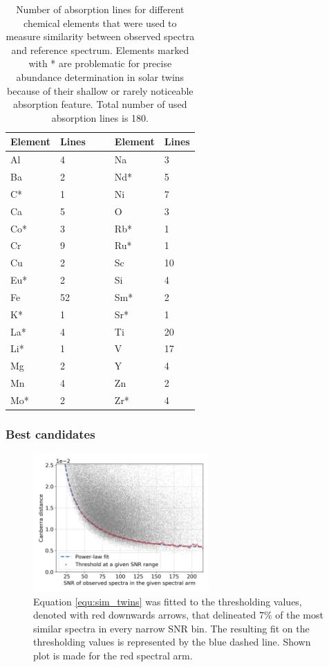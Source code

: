 \begin{table}
	\centering
	\caption{Number of absorption lines for different chemical elements that were used to measure similarity between observed spectra and reference spectrum. Elements marked with * are problematic for precise abundance determination in solar twins because of their shallow or rarely noticeable absorption feature. Total number of used absorption lines is 180.}
	\begin{tabular}{l l c | c l l }
		\hline
		Element & Lines & & & Element & Lines\\ 
		\hline
		Al & 4 & & & Na & 3\\ 
		Ba & 2 & & & Nd* & 5\\ 
		C* & 1 & & & Ni & 7\\ 
		Ca & 5 & & & O & 3 \\ 
		Co* & 3 & & & Rb* & 1\\ 
		Cr & 9 & & & Ru* & 1\\ 
		Cu & 2 & & & Sc & 10\\ 
		Eu* & 2 & & & Si & 4\\ 
		Fe & 52 & & & Sm* & 2\\ 
		K* & 1 & & & Sr* & 1\\ 
		La* & 4 & & & Ti & 20\\ 
		Li* & 1 & & & V & 17\\ 
		Mg & 2 & & & Y & 4\\ 
		Mn & 4 & & & Zn & 2\\ 
		Mo* & 2 & & & Zr* & 4 \\ 
		\hline
	\end{tabular}
	\label{tab:elements_list}
\end{table}

\subsubsection{Best candidates}
\begin{figure}
	\centering
	\includegraphics[width=0.6\textwidth]{canberra_b3_07_envelope.png}
	\caption{Equation \ref{equ:sim_twins} was fitted to the thresholding values, denoted with red downwards arrows, that delineated 7\% of the most similar spectra in every narrow SNR bin. The resulting fit on the thresholding values is represented by the blue dashed line. Shown plot is made for the red spectral arm.}
	\label{fig:envelope_fit_twins}
\end{figure}

